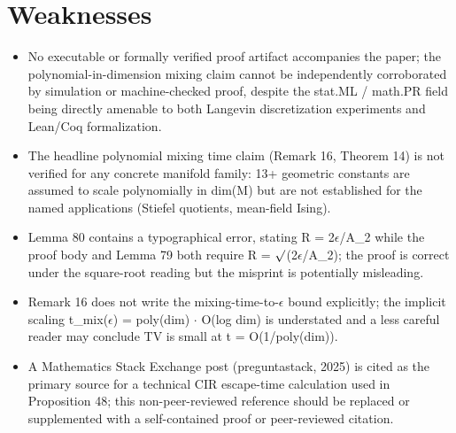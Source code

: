 \documentclass[11pt]{article}
\begin{document}
\section*{Weaknesses}
\begin{itemize}[leftmargin=*]
  \item No executable or formally verified proof artifact accompanies the paper; the polynomial-in-dimension mixing claim cannot be independently corroborated by simulation or machine-checked proof, despite the stat.ML / math.PR field being directly amenable to both Langevin discretization experiments and Lean/Coq formalization.
  \item The headline polynomial mixing time claim (Remark 16, Theorem 14) is not verified for any concrete manifold family: 13+ geometric constants are assumed to scale polynomially in dim(M) but are not established for the named applications (Stiefel quotients, mean-field Ising).
  \item Lemma 80 contains a typographical error, stating R = 2\ensuremath{\epsilon}/A\_2 while the proof body and Lemma 79 both require R = \ensuremath{\surd}(2\ensuremath{\epsilon}/A\_2); the proof is correct under the square-root reading but the misprint is potentially misleading.
  \item Remark 16 does not write the mixing-time-to-\ensuremath{\epsilon} bound explicitly; the implicit scaling t\_mix(\ensuremath{\epsilon}) = poly(dim) \ensuremath{\cdot} O(log dim) is understated and a less careful reader may conclude TV is small at t = O(1/poly(dim)).
  \item A Mathematics Stack Exchange post (preguntastack, 2025) is cited as the primary source for a technical CIR escape-time calculation used in Proposition 48; this non-peer-reviewed reference should be replaced or supplemented with a self-contained proof or peer-reviewed citation.
\end{itemize}
\end{document}
